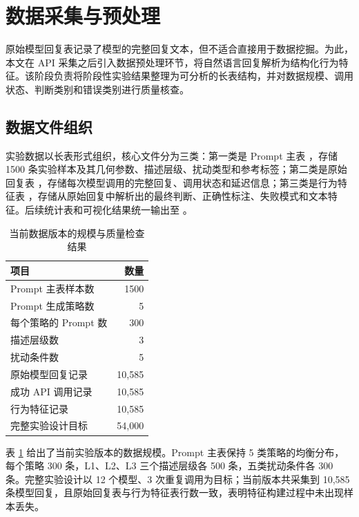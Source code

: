\section{数据采集与预处理}

原始模型回复表记录了模型的完整回复文本，但不适合直接用于数据挖掘。为此，本文在 API 采集之后引入数据预处理环节，将自然语言回复解析为结构化行为特征。该阶段负责将阶段性实验结果整理为可分析的长表结构，并对数据规模、调用状态、判断类别和错误类别进行质量核查。

\subsection{数据文件组织}

实验数据以长表形式组织，核心文件分为三类：第一类是 Prompt 主表 ，存储 1500 条实验样本及其几何参数、描述层级、扰动类型和参考标签；第二类是原始回复表 ，存储每次模型调用的完整回复、调用状态和延迟信息；第三类是行为特征表 ，存储从原始回复中解析出的最终判断、正确性标注、失败模式和文本特征。后续统计表和可视化结果统一输出至 。

\begin{table}[t]
\centering
\caption{当前数据版本的规模与质量检查结果}
\label{tab:data-check-current}
\small
\begin{tabularx}{\columnwidth}{p{}r}
\toprule
项目 & 数量 \\
\midrule
Prompt 主表样本数 & 1500 \\
Prompt 生成策略数 & 5 \\
每个策略的 Prompt 数 & 300 \\
描述层级数 & 3 \\
扰动条件数 & 5 \\
原始模型回复记录 & 10{,}585 \\
成功 API 调用记录 & 10{,}585 \\
行为特征记录 & 10{,}585 \\
完整实验设计目标 & 54{,}000 \\
\bottomrule
\end{tabularx}
\end{table}

表 \ref{tab:data-check-current} 给出了当前实验版本的数据规模。Prompt 主表保持 5 类策略的均衡分布，每个策略 300 条，L1、L2、L3 三个描述层级各 500 条，五类扰动条件各 300 条。完整实验设计以 12 个模型、3 次重复调用为目标；当前版本共采集到 10{,}585 条模型回复，且原始回复表与行为特征表行数一致，表明特征构建过程中未出现样本丢失。


